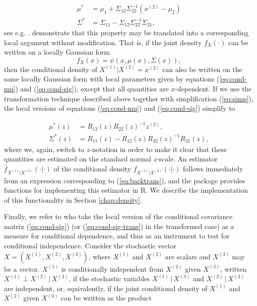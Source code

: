 \begin{align}
\mu^* &= \mu_1 + \Sigma_{12}\Sigma_{22}^{-1}\left(x^{\left(2\right)} - \mu_2\right) \label{eq:cond-mu} \\
\Sigma^* &= \Sigma_{11} - \Sigma_{12}\Sigma_{22}^{-1}\Sigma_{21}, \label{eq:cond-sig}
\end{align}
see e.g. \citet[chapter 4]{john:wich:2007}. \citet{otne:tjos:2018} demonstrate that this property may be translated into a corresponding local argument without modification. That is, if the joint density $f_X\left(\cdot\right)$ can be written on a locally Gaussian form 
$$f_X\left(x\right) = \psi\left(x, \mu\left(x\right), \Sigma\left(x\right)\right),$$
then the conditional density of $X^{\left(1\right)}|X^{\left(2\right)} = x^{\left(2\right)}$ can also be written on the same locally Gaussian form with local parameters given by equations (\ref{eq:cond-mu}) and (\ref{eq:cond-sig}), except that all quantities are $x$-dependent. If we use the transformation technique described above together with simplification (\ref{eq:simp}), the local versions of equations (\ref{eq:cond-mu}) and (\ref{eq:cond-sig}) simplify to

\begin{align}
\mu^*\left(z\right) &= R_{12}\left(z\right)R_{22}\left(z\right)^{-1}z^{\left(2\right)},  \label{eq:cond-mu-trans}\\
\Sigma^*\left(z\right) &= R_{11}\left(z\right) - R_{12}\left(z\right)R_{22}\left(z\right)^{-1}R_{21}\left(z\right), \label{eq:cond-sig-trans}
\end{align}
where we, again, switch to $z$-notation in order to make it clear that these quantities are estimated on the standard normal $z$-scale. An estimator $\widehat f_{X^{\left(1\right)}|X^{\left(2\right)}}\left(\cdot|\cdot\right)$ of the conditional density $f_{X^{\left(1\right)}|X^{\left(2\right)}}\left(\cdot|\cdot\right)$ follows immediately from an expression corresponding to (\ref{eq:backtrans}), and the  package provides functions for implementing this estimator in R. We describe the implementation of this functionality in Section \ref{chap:density}.

Finally, we refer to \citet{otne:tjos:2019} who take the local version of the conditional covariance matrix (\ref{eq:cond-sig}) (or (\ref{eq:cond-sig-trans}) in the transformed case) as a measure for conditional dependence, and thus as an instrument to test for conditional independence. Consider the stochastic vector $X = \left(X^{\left(1\right)}, X^{\left(2\right)}, X^{\left(3\right)}\right)$, where $X^{\left(1\right)}$ and $X^{\left(2\right)}$ are scalars and $X^{\left(3\right)}$ may be a vector. $X^{\left(1\right)}$ is conditionally independent from $X^{\left(2\right)}$ given $X^{\left(3\right)}$, written $X^{\left(1\right)} \perp X^{\left(2\right)} \,|\,X^{\left(3\right)}$, if the stochastic variables $X^{\left(1\right)}\,|\,X^{\left(3\right)}$ and $X^{\left(2\right)}\,|\,X^{\left(3\right)}$ are independent, or, equivalently, if the joint conditional density of $X^{\left(1\right)}$ and $X^{\left(2\right)}$ given $X^{\left(3\right)}$ can be written as the product

